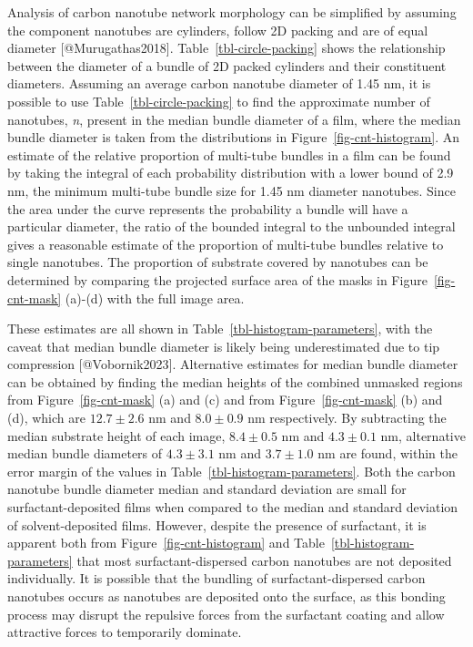 \documentclass[
  letterpaper,
  DIV=11,
  numbers=noendperiod]{scrartcl}
\begin{document}
Analysis of carbon nanotube network morphology can be simplified by
assuming the component nanotubes are cylinders, follow 2D packing and
are of equal diameter {[}@Murugathas2018{]}.
Table~\ref{tbl-circle-packing} shows the relationship between the
diameter of a bundle of 2D packed cylinders and their constituent
diameters. Assuming an average carbon nanotube diameter of 1.45 nm, it
is possible to use Table~\ref{tbl-circle-packing} to find the
approximate number of nanotubes, \emph{n}, present in the median bundle
diameter of a film, where the median bundle diameter is taken from the
distributions in Figure~\ref{fig-cnt-histogram}. An estimate of the
relative proportion of multi-tube bundles in a film can be found by
taking the integral of each probability distribution with a lower bound
of 2.9 nm, the minimum multi-tube bundle size for 1.45 nm diameter
nanotubes. Since the area under the curve represents the probability a
bundle will have a particular diameter, the ratio of the bounded
integral to the unbounded integral gives a reasonable estimate of the
proportion of multi-tube bundles relative to single nanotubes. The
proportion of substrate covered by nanotubes can be determined by
comparing the projected surface area of the masks in
Figure~\ref{fig-cnt-mask} (a)-(d) with the full image area.

These estimates are all shown in Table~\ref{tbl-histogram-parameters},
with the caveat that median bundle diameter is likely being
underestimated due to tip compression {[}@Vobornik2023{]}. Alternative
estimates for median bundle diameter can be obtained by finding the
median heights of the combined unmasked regions from
Figure~\ref{fig-cnt-mask} (a) and (c) and from Figure~\ref{fig-cnt-mask}
(b) and (d), which are \(12.7 \pm 2.6\) nm and \(8.0 \pm 0.9\) nm
respectively. By subtracting the median substrate height of each image,
\(8.4 \pm 0.5\) nm and \(4.3 \pm 0.1\) nm, alternative median bundle
diameters of \(4.3 \pm 3.1\) nm and \(3.7 \pm 1.0\) nm are found, within
the error margin of the values in Table~\ref{tbl-histogram-parameters}.
Both the carbon nanotube bundle diameter median and standard deviation
are small for surfactant-deposited films when compared to the median and
standard deviation of solvent-deposited films. However, despite the
presence of surfactant, it is apparent both from
Figure~\ref{fig-cnt-histogram} and Table~\ref{tbl-histogram-parameters}
that most surfactant-dispersed carbon nanotubes are not deposited
individually. It is possible that the bundling of surfactant-dispersed
carbon nanotubes occurs as nanotubes are deposited onto the surface, as
this bonding process may disrupt the repulsive forces from the
surfactant coating and allow attractive forces to temporarily dominate.
\end{document}
